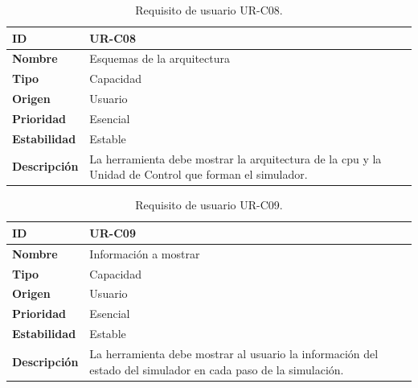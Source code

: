 \begin{center}
\begin{table}[htbp]
\centering
\caption{Requisito de usuario UR-C08.}
\begin{tabular}{@{}p{2.5cm} p{9cm}@{}} 
\toprule
\textbf{ID} 				& UR-C08 \\
\midrule
\textbf{Nombre} 			& Esquemas de la arquitectura \\
\midrule
\textbf{Tipo} 			& Capacidad \\
\midrule
\textbf{Origen} 			& Usuario \\
\midrule
\textbf{Prioridad}		& Esencial \\
\midrule
\textbf{Estabilidad} 		& Estable \\
\midrule
\textbf{Descripción} 	& La herramienta debe mostrar la arquitectura de la \acrshort{cpu} y la Unidad de Control que forman el simulador. \\
\bottomrule
\end{tabular}
\label{tab:urc08}
\end{table}
\end{center}

\begin{center}
\begin{table}[htbp]
\centering
\caption{Requisito de usuario UR-C09.}
\begin{tabular}{@{}p{2.5cm} p{9cm}@{}} 
\toprule
\textbf{ID} 				& UR-C09 \\
\midrule
\textbf{Nombre} 			& Información a mostrar \\
\midrule
\textbf{Tipo} 			& Capacidad \\
\midrule
\textbf{Origen} 			& Usuario \\
\midrule
\textbf{Prioridad}		& Esencial \\
\midrule
\textbf{Estabilidad} 		& Estable \\
\midrule
\textbf{Descripción} 	& La herramienta debe mostrar al usuario la información del estado del simulador en cada paso de la simulación. \\
\bottomrule
\end{tabular}
\label{tab:urc09}
\end{table}
\end{center}


